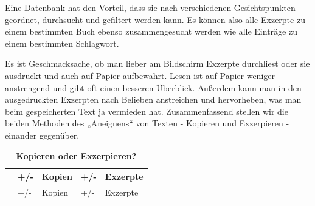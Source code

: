 \documentclass[]{book}
\theoremstyle{definition}
\theoremstyle{definition}
\theoremstyle{definition}
\theoremstyle{remark}
\begin{document}
Eine Datenbank hat den Vorteil, dass sie nach verschiedenen
Gesichtspunkten geordnet, durchsucht und gefiltert werden kann. Es
können also alle Exzerpte zu einem bestimmten Buch ebenso
zusammengesucht werden wie alle Einträge zu einem bestimmten Schlagwort.

Es ist Geschmacksache, ob man lieber am Bildschirm Exzerpte durchliest
oder sie ausdruckt und auch auf Papier aufbewahrt. Lesen ist auf Papier
weniger anstrengend und gibt oft einen besseren Überblick. Außerdem kann
man in den ausgedruckten Exzerpten nach Belieben anstreichen und
hervorheben, was man beim gespeicherten Text ja vermieden hat.
Zusammenfassend stellen wir die beiden Methoden des „Aneignens`` von
Texten - Kopieren und Exzerpieren - einander gegenüber.

\begin{longtable}[]{@{}lllll@{}}
\caption{\textbf{\label{tab:kopieren-exzerpieren} Kopieren oder
Exzerpieren?}}\tabularnewline
\toprule
\begin{minipage}[b]{0.28\columnwidth}\raggedright\strut
\strut
\end{minipage} & \begin{minipage}[b]{0.04\columnwidth}\raggedright\strut
+/-\strut
\end{minipage} & \begin{minipage}[b]{0.21\columnwidth}\raggedright\strut
Kopien\strut
\end{minipage} & \begin{minipage}[b]{0.04\columnwidth}\raggedright\strut
+/-\strut
\end{minipage} & \begin{minipage}[b]{0.28\columnwidth}\raggedright\strut
Exzerpte\strut
\end{minipage}\tabularnewline
\midrule
\endfirsthead
\toprule
\begin{minipage}[b]{0.28\columnwidth}\raggedright\strut
\strut
\end{minipage} & \begin{minipage}[b]{0.04\columnwidth}\raggedright\strut
+/-\strut
\end{minipage} & \begin{minipage}[b]{0.21\columnwidth}\raggedright\strut
Kopien\strut
\end{minipage} & \begin{minipage}[b]{0.04\columnwidth}\raggedright\strut
+/-\strut
\end{minipage} & \begin{minipage}[b]{0.28\columnwidth}\raggedright\strut
Exzerpte\strut

\end{minipage}
\end{longtable}
\end{document}
